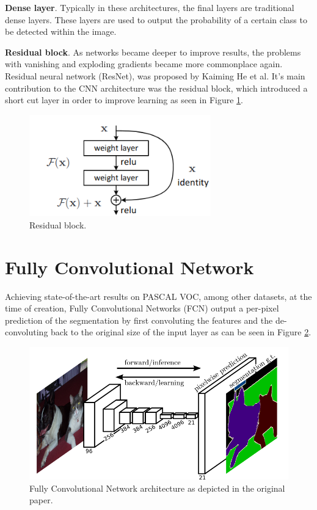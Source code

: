 \documentclass[english, bibtex]{kththesis}
\begin{document}
\textbf{Dense layer}. Typically in these architectures, the final layers are traditional dense layers. These layers are used to output the probability of a certain class to be detected within the image. 

\textbf{Residual block}. As networks became deeper to improve results, the problems with vanishing and exploding gradients became more commonplace again. Residual neural network (ResNet), was proposed by Kaiming He et al\cite{he2016deep}. It’s main contribution to the CNN architecture was the residual block, which introduced a short cut layer in order to improve learning as seen in Figure \ref{fig:residual}. 

\begin{figure}[H]
  \begin{center}
    \includegraphics[width=0.7\textwidth]{figures/residual_block.png}
  \end{center}
  \caption{Residual block\cite{he2016deep}.}
  \label{fig:residual}
\end{figure}

\section{Fully Convolutional Network}

Achieving state-of-the-art results on PASCAL VOC\cite{DBLP:journals/corr/LongSD14}, among other datasets, at the time of creation, Fully Convolutional Networks (FCN) output a per-pixel prediction of the segmentation by first convoluting the features and the de-convoluting back to the original size of the input layer as can be seen in Figure \ref{fig:fcn}. 

\begin{figure}[H]
  \begin{center}
    \includegraphics[width=1.0\textwidth]{figures/fcn.png}
  \end{center}
  \caption{Fully Convolutional Network architecture as depicted in the original paper\cite{DBLP:journals/corr/LongSD14}.}
  \label{fig:fcn}
\end{figure}
\end{document}
